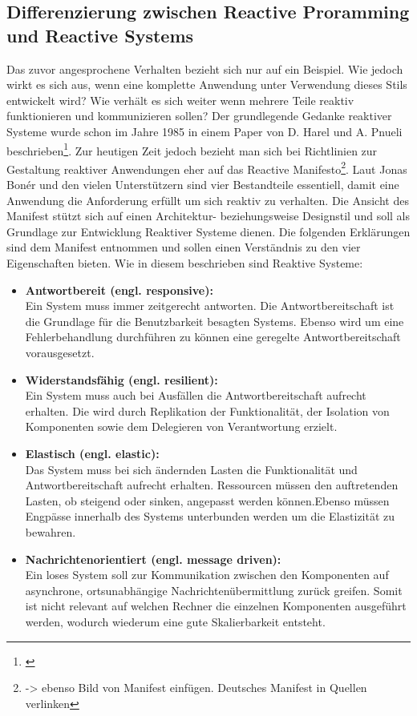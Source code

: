 \subsection{Differenzierung zwischen Reactive Proramming und Reactive Systems}
Das zuvor angesprochene Verhalten bezieht sich nur auf ein Beispiel. Wie jedoch wirkt es sich aus, wenn eine komplette Anwendung unter Verwendung dieses Stils entwickelt wird? Wie verhält es sich weiter wenn mehrere Teile reaktiv funktionieren und kommunizieren sollen? Der grundlegende Gedanke reaktiver Systeme wurde schon im Jahre 1985 in einem Paper von D. Harel und A. Pnueli beschrieben\footnote{\cite{Harel1985}}. Zur heutigen Zeit jedoch bezieht man sich bei Richtlinien zur Gestaltung reaktiver Anwendungen eher auf das Reactive Manifesto\footnote{\cite{Boner.} -> ebenso Bild von Manifest einfügen. Deutsches Manifest in Quellen verlinken}. Laut Jonas Bonér und den vielen Unterstützern sind vier Bestandteile essentiell, damit eine Anwendung die Anforderung erfüllt um sich reaktiv zu verhalten. Die Ansicht des Manifest stützt sich auf einen Architektur- beziehungsweise Designstil und soll als Grundlage zur Entwicklung Reaktiver Systeme dienen. Die folgenden Erklärungen sind dem Manifest entnommen und sollen einen Verständnis zu den vier Eigenschaften bieten. Wie in diesem beschrieben sind Reaktive Systeme:
\begin{itemize}
	\item \textbf{Antwortbereit (engl. responsive):}\\ Ein System muss immer zeitgerecht antworten. Die Antwortbereitschaft ist die Grundlage für die Benutzbarkeit besagten Systems. Ebenso wird um eine Fehlerbehandlung durchführen zu können eine geregelte Antwortbereitschaft vorausgesetzt.
	\item \textbf{Widerstandsfähig (engl. resilient):}\\ Ein System muss auch bei Ausfällen die Antwortbereitschaft aufrecht erhalten. Die wird durch Replikation der Funktionalität, der Isolation von Komponenten sowie dem Delegieren von Verantwortung erzielt. 
	\item \textbf{Elastisch (engl. elastic):}\\ Das System muss bei sich ändernden Lasten die Funktionalität und Antwortbereitschaft aufrecht erhalten. Ressourcen müssen den auftretenden Lasten, ob steigend oder sinken, angepasst werden können.Ebenso müssen Engpässe innerhalb des Systems unterbunden werden um die Elastizität zu bewahren.
	\item \textbf{Nachrichtenorientiert (engl. message driven):}\\ Ein loses System soll zur Kommunikation zwischen den Komponenten auf asynchrone, ortsunabhängige Nachrichtenübermittlung zurück greifen. Somit ist nicht relevant auf welchen Rechner die einzelnen Komponenten ausgeführt werden, wodurch wiederum eine gute Skalierbarkeit entsteht.
\end{itemize}
